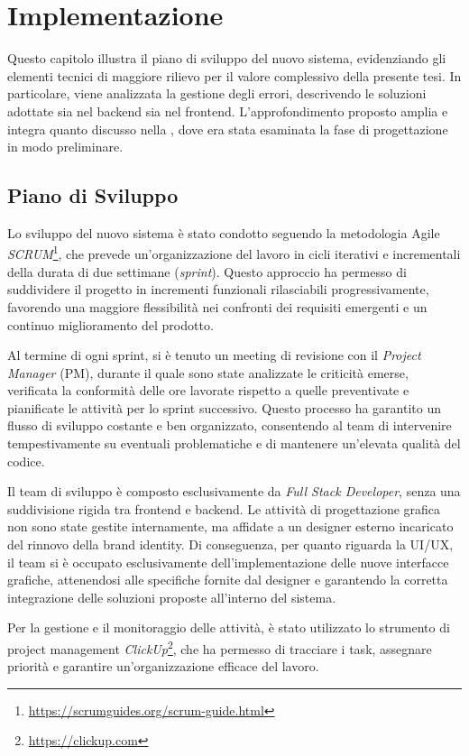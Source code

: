 \chapter{Implementazione}

Questo capitolo illustra il piano di sviluppo del nuovo sistema, evidenziando gli elementi tecnici di maggiore rilievo per il valore complessivo della presente tesi. In particolare, viene analizzata la gestione degli errori, descrivendo le soluzioni adottate sia nel backend sia nel frontend. L'approfondimento proposto amplia e integra quanto discusso nella , dove era stata esaminata la fase di progettazione in modo preliminare.

\section{Piano di Sviluppo}
Lo sviluppo del nuovo sistema è stato condotto seguendo la metodologia Agile \textit{SCRUM}\footnote{\url{https://scrumguides.org/scrum-guide.html}}, che prevede un'organizzazione del lavoro in cicli iterativi e incrementali della durata di due settimane (\textit{sprint}). Questo approccio ha permesso di suddividere il progetto in incrementi funzionali rilasciabili progressivamente, favorendo una maggiore flessibilità nei confronti dei requisiti emergenti e un continuo miglioramento del prodotto.

Al termine di ogni sprint, si è tenuto un meeting di revisione con il \textit{Project Manager} (PM), durante il quale sono state analizzate le criticità emerse, verificata la conformità delle ore lavorate rispetto a quelle preventivate e pianificate le attività per lo sprint successivo. Questo processo ha garantito un flusso di sviluppo costante e ben organizzato, consentendo al team di intervenire tempestivamente su eventuali problematiche e di mantenere un'elevata qualità del codice.

Il team di sviluppo è composto esclusivamente da \textit{Full Stack Developer}, senza una suddivisione rigida tra frontend e backend. Le attività di progettazione grafica non sono state gestite internamente, ma affidate a un designer esterno incaricato del rinnovo della brand identity. Di conseguenza, per quanto riguarda la UI/UX, il team si è occupato esclusivamente dell'implementazione delle nuove interfacce grafiche, attenendosi alle specifiche fornite dal designer e garantendo la corretta integrazione delle soluzioni proposte all'interno del sistema.

Per la gestione e il monitoraggio delle attività, è stato utilizzato lo strumento di project management \textit{ClickUp}\footnote{\url{https://clickup.com}}, che ha permesso di tracciare i task, assegnare priorità e garantire un'organizzazione efficace del lavoro.

